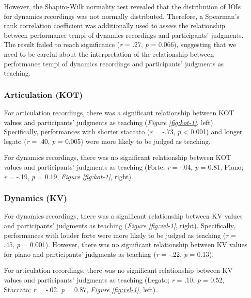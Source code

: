 \documentclass[
  man,floatsintext]{apa6}
\begin{document}
However, the Shapiro-Wilk normality test revealed that the distribution of IOIs for dynamics recordings was not normally distributed. Therefore, a Spearman's rank correlation coefficient was additionally used to assess the relationship between performance tempi of dynamics recordings and participants' judgments. The result failed to reach significance (\emph{r} = .27, \emph{p} = 0.066), suggesting that we need to be careful about the interpretation of the relationship between performance tempi of dynamics recordings and participants' judgments as teaching.

\hypertarget{articulation-kot}{%
\subsubsection{Articulation (KOT)}\label{articulation-kot}}

For articulation recordings, there was a significant relationship between KOT values and participants' judgments as teaching (\emph{Figure \ref{fig:kot-1}}, left). Specifically, performances with shorter staccato (\emph{r} = -.73, \emph{p} \textless{} 0.001) and longer legato (\emph{r} = .40, \emph{p} = 0.005) were more likely to be judged as teaching.

For dynamics recordings, there was no significant relationship between KOT values and participants' judgments as teaching (Forte; \emph{r} = -.04, \emph{p} = 0.81, Piano; \emph{r} = -.19, \emph{p} = 0.19, \emph{Figure \ref{fig:kot-1}}, right).

\hypertarget{dynamics-kv}{%
\subsubsection{Dynamics (KV)}\label{dynamics-kv}}

For dynamics recordings, there was a significant relationship between KV values and participants' judgments as teaching (\emph{Figure \ref{fig:vel-1}}, right). Specifically, performances with louder forte were more likely to be judged as teaching (\emph{r} = .45, \emph{p} = 0.001). However, there was no significant relationship between KV values for piano and participants' judgments as teaching (\emph{r} = -.22, \emph{p} = 0.13).

For articulation recordings, there was no significant relationship between KV values and participants' judgments as teaching (Legato; \emph{r} = .10, \emph{p} = 0.52, Staccato; \emph{r} = -.02, \emph{p} = 0.87, \emph{Figure \ref{fig:vel-1}}, left).
\end{document}
